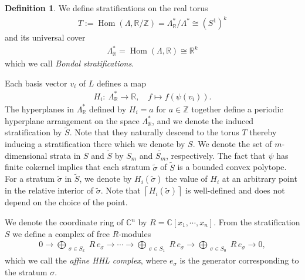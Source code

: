 \documentclass[11pt,reqno]{amsart}
\def\C {{\mathbb C}}
\def\R {{\mathbb R}}
\def\Z {{\mathbb Z}}
\theoremstyle{definition}
\newtheorem{definition}[theorem]{Definition}
\numberwithin{equation}{section}
\begin{document}
\begin{definition}
    We define stratifications on the real torus
    \begin{align*}
        T := \operatorname{Hom}(\Lambda, \R/\Z) = \Lambda^*_{\R} / \Lambda^* \cong (S^1)^k
    \end{align*}
    and its universal cover
    \begin{align*}
        \Lambda^*_{\R} = \operatorname{Hom}(\Lambda, \R)  \cong \R^k
    \end{align*}
    which we call \textit{Bondal stratifications}.
\end{definition}

Each basis vector $v_i$ of $L$ defines a map
\begin{align*}
    H_{i}:\ \Lambda^*_{\R} \rightarrow\R,\quad f\mapsto f(\psi(v_i)).
\end{align*}
The hyperplanes in $\Lambda^*_{\R}$ defined by $H_i = a$ for $a\in \Z$ together define a periodic hyperplane arrangement on the space $\Lambda^*_{\R}$, and we denote the induced stratification by $\widetilde{S}$. Note that they naturally descend to the torus $T$ thereby inducing a stratification there which we denote by $S$. We denote the set of $m$-dimensional strata in $S$ and $\widetilde{S}$ by $S_m$ and $\widetilde{S_m}$, respectively. The fact that $\psi$ has finite cokernel implies that each stratum $\widetilde{\sigma}$ of $\widetilde{S}$ is a bounded convex polytope. For a stratum $\widetilde{\sigma}$ in $\widetilde{S}$, we denote by $H_{i}(\widetilde{\sigma})$ the value of $H_{i}$ at an arbitrary point in the relative interior of $\widetilde{\sigma}$. Note that $\left\lceil H_{i}(\widetilde{\sigma})  \right\rceil $ is well-defined and does not depend on the choice of the point.



\smallskip

We denote the coordinate ring of $\C^n$ by $R=\C[x_1,\cdots,x_n]$. From the stratification $S$ we define a complex of free $R$-modules
\begin{align}\label{eq-affine-HHL-complex}
    0\rightarrow\bigoplus_{\substack{\sigma\in S_{k} }} R\, e_{\sigma} \rightarrow \cdots \rightarrow \bigoplus_{\substack{\sigma\in S_{1}}} R\, e_{\sigma} \rightarrow \bigoplus_{\substack{\sigma\in S_{0}}} R\, e_{\sigma}\rightarrow0,
\end{align}
which we call the \textit{affine HHL complex}, where $e_{\sigma}$ is the generator corresponding to the stratum $\sigma$. 
\end{document}
